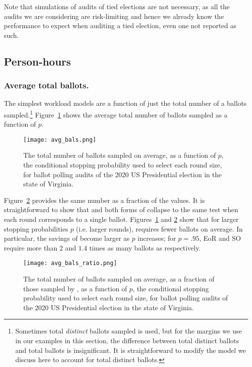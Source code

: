 Note that simulations of audits of tied elections are not necessary, as all the audits we are considering are risk-limiting and hence we already know the performance to expect when auditing a tied election, even one not reported as such. 

\subsection{Person-hours}

\subsubsection{Average total ballots.} 
The simplest workload models are a function of just the total number of a ballots sampled.\footnote{Sometimes total \emph{distinct} ballots sampled is used, but for the margins we use in our examples in this section, the difference between total distinct ballots and total ballots is insignificant\cite{arxiv_athena}. It is straightforward to modify the model we discuss here to account for total distinct ballots.} Figure~\ref{fig:avg_bals} shows the average total number of ballots sampled as a function of $p$.
\begin{figure}[h!]
\texttt{[image: avg\_bals.png]}
\caption{The total number of ballots sampled on average, as a function of $p$, the conditional stopping probability used to select each round size, for ballot polling audits of the 2020 US Presidential election in the state of Virginia.}
\label{fig:avg_bals}
\end{figure}

Figure~\ref{fig:avg_bals_ratio} provides the same number as a fraction of the \Providence values.
It is straightforward to show that \Providence and both forms of \BRAVO collapse to the same test when each round corresponds to a single ballot. Figures~\ref{fig:avg_bals} and \ref{fig:avg_bals_ratio} show that for larger stopping probabilities $p$ (i.e. larger rounds), \Providence requires fewer ballots on average. In particular, the savings of \Providence become larger as $p$ increases; for $p=.95$, EoR \BRAVO and SO \BRAVO require more than $2$ and $1.4$ times as many ballots as \Providence respectively. 
\begin{figure}[h!]
\texttt{[image: avg\_bals\_ratio.png]}
\caption{The total number of ballots sampled on average, as a fraction of those sampled by \Providence, as a function of $p$, the conditional stopping probability used to select each round size, for ballot polling audits of the 2020 US Presidential election in the state of Virginia.}
\label{fig:avg_bals_ratio}
\end{figure}


